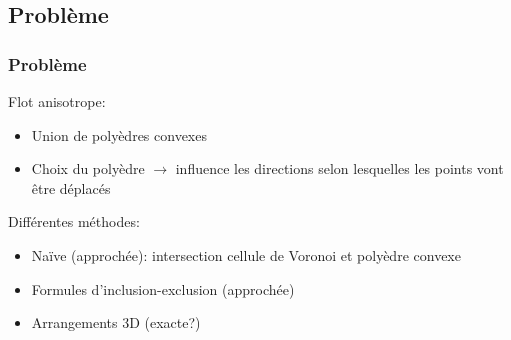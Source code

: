 \documentclass{beamer}
\begin{document}
\subsection{Problème}
\begin{frame}
    \frametitle{Problème}

    Flot anisotrope:
    \begin{itemize}
        \item Union de polyèdres convexes
        \item Choix du polyèdre $ \to $ influence les directions selon
            lesquelles les points vont être déplacés
    \end{itemize}

    Différentes méthodes:
    \begin{itemize}
        \item Naïve (approchée): intersection cellule de Voronoi et polyèdre
            convexe
        \item Formules d'inclusion-exclusion (approchée)
        \item Arrangements 3D (exacte?)
    \end{itemize}
\end{frame}
\end{document}

